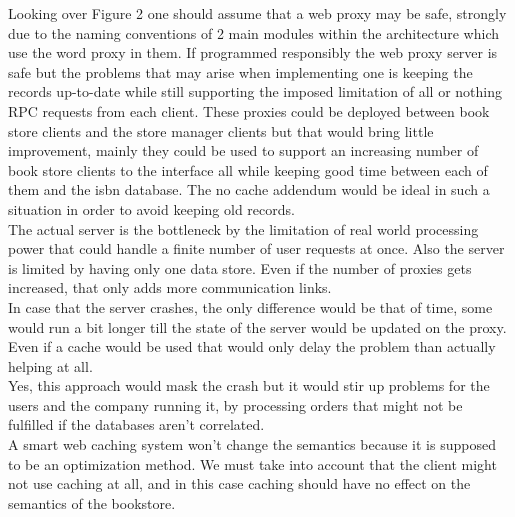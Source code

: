 \documentclass{article}      %
\begin{document}
Looking over Figure 2 one should assume that a web proxy may be safe, strongly due to the naming conventions of 2 main modules within the architecture which use the word proxy in them. 
If programmed responsibly the web proxy server is safe but the problems that may arise when implementing one is keeping the records up-to-date while still supporting the imposed limitation of all or nothing RPC requests from each client. These proxies could be deployed between book store clients and the store manager clients but that would bring little improvement, mainly they could be used to support an increasing number of book store clients to the interface all while keeping good time between each of them and the isbn database. The no cache addendum would be ideal in such a situation in order to avoid keeping old records.\\

The actual server is the bottleneck by the limitation of real world processing power that could handle a finite number of user requests at once. Also the server is limited by having only one data store. Even if the number of proxies gets increased, that only adds more communication links. \\

In case that the server crashes, the only difference would be that of time, some would run a bit longer till the state of the server would be updated on the proxy. Even if a cache would be used that would only delay the problem than actually helping at all.\\

Yes, this approach would mask the crash but it would stir up problems for the users and the company running it, by processing orders that might not be fulfilled if the databases aren't correlated.\\

A smart web caching system won't change the semantics because it is supposed to be an optimization method. We must take into account that the client might not use caching at all, and in this case caching should have no effect on the semantics of the bookstore.\\
\end{document}
